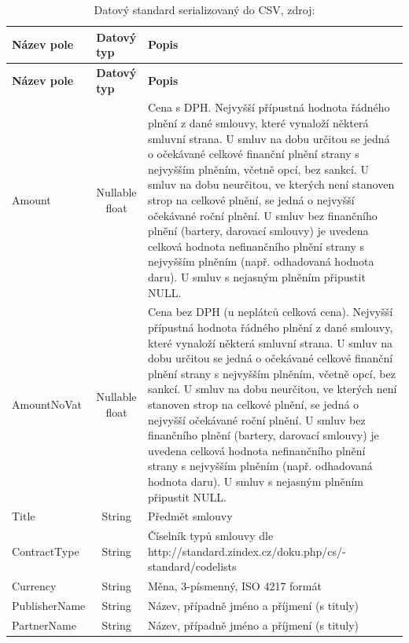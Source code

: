 \begin{center}
\begin{longtable}{lcp{65mm}}
\label{tbl:schema_csv} \\
\multicolumn{1}{l}{\textbf{Název pole}} & 
\multicolumn{1}{l}{\textbf{Datový typ}} & 
\multicolumn{1}{l}{\textbf{Popis}} \\ \hline 
\endfirsthead
\multicolumn{1}{l}{\textbf{Název pole}} & 
\multicolumn{1}{l}{\textbf{Datový typ}} & 
\multicolumn{1}{l}{\textbf{Popis}} \\ \hline 
\hline
\endhead
\endfoot
\caption[Datový standard serializovaný do CSV]{Datový standard serializovaný do CSV, zdroj:\cite{metodika, standard}}
\endlastfoot
\rowcolor{validateC}Amount & Nullable float & Cena s DPH. Nejvyšší přípustná hodnota řádného plnění z dané smlouvy, které vynaloží některá smluvní strana. U smluv na dobu určitou se jedná o očekávané celkové finanční plnění strany s nejvyšším plněním, včetně opcí, bez sankcí. U smluv na dobu neurčitou, ve kterých není stanoven strop na celkové plnění, se jedná o nejvyšší očekávané roční plnění. U smluv bez finančního plnění (bartery, darovací smlouvy) je uvedena celková hodnota nefinančního plnění strany s nejvyšším plněním (např. odhadovaná hodnota daru). U smluv s nejasným plněním připustit NULL. \\
\rowcolor{validateC}AmountNoVat & Nullable float & Cena bez DPH (u neplátců celková cena). Nejvyšší přípustná hodnota řádného plnění z dané smlouvy, které vynaloží některá smluvní strana. U smluv na dobu určitou se jedná o očekávané celkové finanční plnění strany s nejvyšším plněním, včetně opcí, bez sankcí. U smluv na dobu neurčitou, ve kterých není stanoven strop na celkové plnění, se jedná o nejvyšší očekávané roční plnění. U smluv bez finančního plnění (bartery, darovací smlouvy) je uvedena celková hodnota nefinančního plnění strany s nejvyšším plněním (např. odhadovaná hodnota daru). U smluv s nejasným plněním připustit NULL. \\
\rowcolor{validateC}Title & String & Předmět smlouvy \\
ContractType & String & Číselník typů smlouvy dle http://standard.zindex.cz/doku.php/cs/- standard/codelists \\
Currency & String & Měna, 3-písmenný, ISO 4217 formát \\
\rowcolor{validateC}PublisherName & String & Název, případně jméno a příjmení (s tituly) \\
\rowcolor{validateC}PartnerName &String & Název, případně jméno a příjmení (s tituly) \\

\end{longtable}
\end{center}
